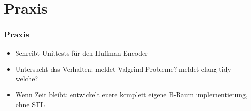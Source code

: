 \documentclass[aspectratio=169]{beamer}
\begin{document}
\section{Praxis}
\begin{frame}
    \frametitle{Praxis}
    \begin{itemize}
        \item Schreibt Unittests für den Huffman Encoder
            \pause
        \item Untersucht das Verhalten: meldet Valgrind Probleme? meldet clang-tidy welche?
            \pause
        \item Wenn Zeit bleibt: entwickelt euere komplett eigene B-Baum implementierung, ohne STL
    \end{itemize}
\end{frame}
\end{document}
